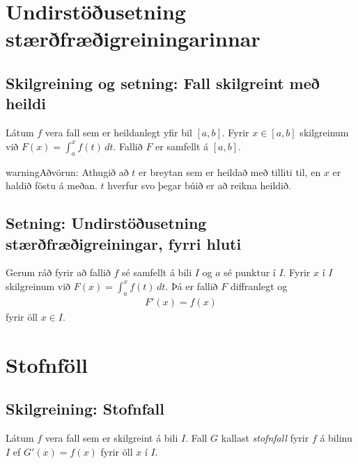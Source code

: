 \documentclass[b5paper,11pt,icelandic]{sphinxmanual}
\begin{document}
\section{Undirstöðusetning stærðfræðigreiningarinnar}
\label{kafli06:undirstousetning-staerfraeigreiningarinnar}

\subsection{Skilgreining og setning: Fall skilgreint með heildi}
\label{kafli06:index-5}\label{kafli06:skilgreining-og-setning-fall-skilgreint-me-heildi}
Látum \(f\) vera fall sem er heildanlegt yfir bil \([a, b]\).
Fyrir \(x\in[a, b]\) skilgreinum við \(F(x)=\int_a^x f(t)\,dt\).
Fallið \(F\) er samfellt á \([a, b]\).

\begin{notice}{warning}{Aðvörun:}
Athugið að \(t\) er breytan sem er heildað með tilliti til, en
\(x\) er haldið föstu á meðan. \(t\) hverfur svo þegar búið er
að reikna heildið.
\end{notice}


\subsection{Setning: Undirstöðusetning stærðfræðigreiningar, fyrri hluti}
\label{kafli06:undirstodusetning-fyrri}\label{kafli06:index-6}\label{kafli06:setning-undirstousetning-staerfraeigreiningar-fyrri-hluti}
Gerum ráð fyrir að fallið \(f\) sé samfellt á bili \(I\) og
\(a\) sé punktur í \(I\). Fyrir \(x\) í \(I\)
skilgreinum við \(F(x)=\int_a^x f(t)\,dt\). Þá er fallið \(F\)
diffranlegt og
\begin{equation*}
\begin{split}F'(x)=f(x)\end{split}
\end{equation*}
fyrir öll \(x\in I\).


\section{Stofnföll}
\label{kafli06:stofnfoll}\label{kafli06:index-7}

\subsection{Skilgreining: Stofnfall}
\label{kafli06:skilgreining-stofnfall}
Látum \(f\) vera fall sem er skilgreint á bili \(I\). Fall
\(G\) kallast \textit{stofnfall} fyrir \(f\) á
bilinu \(I\) ef \(G'(x)=f(x)\) fyrir öll \(x\) í \(I\).
\end{document}
